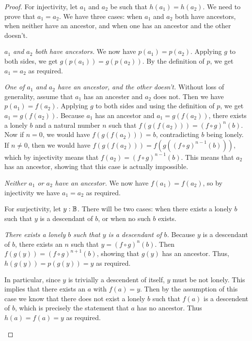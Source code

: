 \documentclass[../../math.tex]{subfiles}
\begin{document}
\begin{proof}
    For injectivity, let $a_1$ and $a_2$ be such that $h(a_1) = h(a_2)$.  We
    need to prove that $a_1 = a_2$.  We have three cases: when $a_1$ and $a_2$
    both have ancestors, when neither have an ancestor, and when one has an
    ancestor and the other doesn't.
    \begin{case} \textit{$a_1$ and $a_2$ both have ancestors.}
        We now have $p(a_1) = p(a_2)$.  Applying $g$ to both sides, we get
        $g(p(a_1)) = g(p(a_2))$.  By the definition of $p$, we get $a_1 = a_2$
        as required.
    \end{case}
    \begin{case} \textit{One of $a_1$ and $a_2$ have an ancestor, and the other
        doesn't.}
        Without loss of generality, assume that $a_1$ has an ancester and $a_2$
        does not.  Then we have $p(a_1) = f(a_2)$.  Applying $g$ to both sides
        and using the definition of $p$, we get $a_1 = g(f(a_2))$.  Because
        $a_1$ has an ancestor and $a_1 = g(f(a_2))$, there exists a lonely $b$
        and a natural number $n$ such that $f(g(f(a_2))) = (f \circ g)^n(b)$.
        Now if $n = 0$, we would have $f(g(f(a_2))) = b$, contradicting $b$
        being lonely.  If $n \neq 0$, then we would have $f(g(f(a_2))) = f(g((f
        \circ g)^{n-1}(b)))$, which by injectivity means that $f(a_2) = (f \circ
        g)^{n-1}(b)$.  This means that $a_2$ has an ancestor, showing that this
        case is actually impossible.
    \end{case}
    \begin{case} \textit{Neither $a_1$ or $a_2$ have an ancestor.}
        We now have $f(a_1) = f(a_2)$, so by injectivity we have $a_1 = a_2$ as
        required.
    \end{case}

    For surjectivity, let $y : \mathbb{B}$.  There will be two cases: when there exists
    a lonely $b$ such that $y$ is a descendant of $b$, or when no such $b$
    exists.
    \setcounter{case}{0}
    \begin{case} \textit{There exists a lonely $b$ such that $y$ is a descendant
        of $b$.}
        Because $y$ is a descendant of $b$, there exists an $n$ such that $y =
        (f \circ g)^n(b)$.  Then $f(g(y)) = (f \circ g)^{n+1}(b)$, showing that
        $g(y)$ has an ancestor.  Thus, $h(g(y)) = p(g(y)) = y$ as required.
    \end{case}
    \begin{case} 
        In particular, since $y$ is trivially a descendent of itself, $y$ must
        be not lonely.  This implies that there exists an $a$ with $f(a) = y$.
        Then by the assumption of this case we know that there does not exist a
        lonely $b$ such that $f(a)$ is a descendent of $b$, which is precisely
        the statement that $a$ has no ancestor.  Thus $h(a) = f(a) = y$ as
        required.
    \end{case}
\end{proof}
\end{document}
